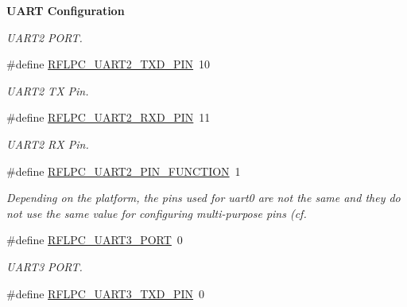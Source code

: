 \begin{Indent}{\bf U\-A\-R\-T Configuration}
\begin{DoxyCompactItemize}
\begin{DoxyCompactList}\small\item\em U\-A\-R\-T2 P\-O\-R\-T. \end{DoxyCompactList}\item 
\hypertarget{group__config_ga7fb82741537cdfd04bb47663c3f51859}{\#define \hyperlink{group__config_ga7fb82741537cdfd04bb47663c3f51859}{R\-F\-L\-P\-C\-\_\-\-U\-A\-R\-T2\-\_\-\-T\-X\-D\-\_\-\-P\-I\-N}~10}\label{group__config_ga7fb82741537cdfd04bb47663c3f51859}

\begin{DoxyCompactList}\small\item\em U\-A\-R\-T2 T\-X Pin. \end{DoxyCompactList}\item 
\hypertarget{group__config_ga48508620183c256d73ea0e6cd27e8832}{\#define \hyperlink{group__config_ga48508620183c256d73ea0e6cd27e8832}{R\-F\-L\-P\-C\-\_\-\-U\-A\-R\-T2\-\_\-\-R\-X\-D\-\_\-\-P\-I\-N}~11}\label{group__config_ga48508620183c256d73ea0e6cd27e8832}

\begin{DoxyCompactList}\small\item\em U\-A\-R\-T2 R\-X Pin. \end{DoxyCompactList}\item 
\#define \hyperlink{group__config_ga407dd3739a66a95a6252951ec28b7ae0}{R\-F\-L\-P\-C\-\_\-\-U\-A\-R\-T2\-\_\-\-P\-I\-N\-\_\-\-F\-U\-N\-C\-T\-I\-O\-N}~1
\begin{DoxyCompactList}\small\item\em Depending on the platform, the pins used for uart0 are not the same and they do not use the same value for configuring multi-\/purpose pins (cf. \end{DoxyCompactList}\item 
\hypertarget{group__config_gae693d2010094f1d87d124a7888758645}{\#define \hyperlink{group__config_gae693d2010094f1d87d124a7888758645}{R\-F\-L\-P\-C\-\_\-\-U\-A\-R\-T3\-\_\-\-P\-O\-R\-T}~0}\label{group__config_gae693d2010094f1d87d124a7888758645}

\begin{DoxyCompactList}\small\item\em U\-A\-R\-T3 P\-O\-R\-T. \end{DoxyCompactList}\item 
\hypertarget{group__config_ga9f0d2ed7c6a82bc0abdb2a29f63ff5dc}{\#define \hyperlink{group__config_ga9f0d2ed7c6a82bc0abdb2a29f63ff5dc}{R\-F\-L\-P\-C\-\_\-\-U\-A\-R\-T3\-\_\-\-T\-X\-D\-\_\-\-P\-I\-N}~0}\label{group__config_ga9f0d2ed7c6a82bc0abdb2a29f63ff5dc}


\end{DoxyCompactItemize}
\end{Indent}
